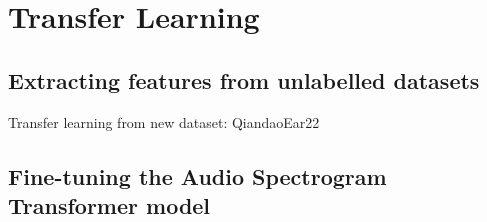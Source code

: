 \chapter{Transfer Learning}

\section{Extracting features from unlabelled datasets}

Transfer learning from new dataset: QiandaoEar22

\section{Fine-tuning the Audio Spectrogram Transformer model}
